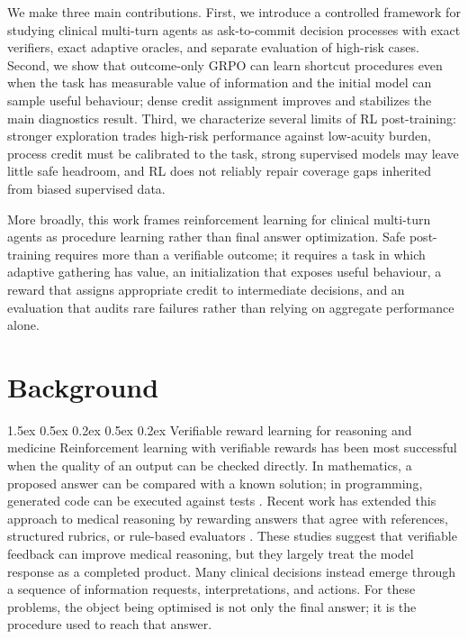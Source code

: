 \documentclass{article}
\makeatletter
\renewcommand{\paragraph}{%
  \@startsection{paragraph}{4}{\z@}%
                {1.5ex \@plus 0.5ex \@minus 0.2ex}%
                {0.5ex \@plus 0.2ex}%
                {\normalsize\bf}}
\makeatother
\begin{document}
We make three main contributions. First, we introduce a controlled framework for
studying clinical multi-turn agents as ask-to-commit decision processes with exact
verifiers, exact adaptive oracles, and separate evaluation of high-risk cases.
Second, we show that outcome-only GRPO can learn shortcut procedures even when the
task has measurable value of information and the initial model can sample useful
behaviour; dense credit assignment improves and stabilizes the main diagnostics
result. Third, we characterize several limits of RL post-training: stronger
exploration trades high-risk performance against low-acuity burden, process credit
must be calibrated to the task, strong supervised models may leave little safe
headroom, and RL does not reliably repair coverage gaps inherited from biased
supervised data.

More broadly, this work frames reinforcement learning for clinical multi-turn agents
as procedure learning rather than final answer optimization. Safe post-training
requires more than a verifiable outcome; it requires a task in which adaptive
gathering has value, an initialization that exposes useful behaviour, a reward that
assigns appropriate credit to intermediate decisions, and an evaluation that audits
rare failures rather than relying on aggregate performance alone.

\FloatBarrier
\section{Background}
\label{sec:background}

\paragraph{Verifiable reward learning for reasoning and medicine}
Reinforcement learning with verifiable rewards has been most successful when the
quality of an output can be checked directly. In mathematics, a proposed answer
can be compared with a known solution; in programming, generated code can be
executed against tests \citep{shao2024deepseekmath}. Recent work has extended
this approach to medical reasoning by rewarding answers that agree with
references, structured rubrics, or rule-based evaluators
\citep{chen2024huatuogpto1, zhang2025medrlvr, lin2025ehrmind}. These studies
suggest that verifiable feedback can improve medical reasoning, but they largely
treat the model response as a completed product. Many clinical decisions instead
emerge through a sequence of information requests, interpretations, and actions.
For these problems, the object being optimised is not only the final answer; it
is the procedure used to reach that answer.
\end{document}

